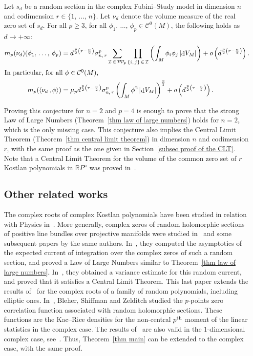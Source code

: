 \documentclass[10pt]{amsart}
\theoremstyle{definition}\newtheorem{defi}[theo]{Definition}\newtheorem{rema}[theo]{Remark}\newtheorem{exam}[theo]{Example}\newtheorem{exem}[theo]{Example}\newtheorem{nota}[theo]{Notation}
\DeclareMathOperator{\dmesure}{d}
\newcommand{\I}{\mathcal{I}}
\newcommand{\clC}{\mathcal{C}}
\newcommand{\pp}{\mathcal{P\!P}\!}
\newcommand{\R}{\mathbb{R}}
\newcommand{\norm}[1]{\left\lvert #1 \right\rvert}
\newcommand{\prsc}[2]{\left\langle #1\,, #2 \right\rangle}
\newcommand{\rmes}[1]{\norm{\dmesure\! V_{#1}}}
\renewcommand{\geq}{\geqslant}
\begin{document}
\begin{conj}
Let $s_d$ be a random section in the complex Fubini--Study model in dimension $n$ and codimension $r \in \{1,\,\dots,\,n\}$. Let $\nu_d$ denote the volume measure of the real zero set of $s_d$. For all $p \geq 3$, for all $\phi_1,\,\dots,\,\phi_p \in \clC^0(M)$, the following holds as $d \to +\infty$:
\begin{align*}
m_p(\nu_d)(\phi_1,\,\dots,\,\phi_p) &= d^{\frac{p}{2}\left(r-\frac{n}{2}\right)}\sigma_{n,\,r}^p \sum_{\I\,\in\,\pp_p} \prod_{\{i,\,j\}\,\in\,\I} \left(\int_M \phi_i\phi_j \rmes{M}\right) + o\left(d^{\frac{p}{2}\left(r-\frac{n}{2}\right)}\right).
\\
\intertext{In particular, for all $\phi \in \clC^0(M)$,}
m_p(\prsc{\nu_d}{\phi}) &= \mu_p d^{\frac{p}{2}\left(r-\frac{n}{2}\right)}\sigma_{n,\,r}^p \left(\int_M \phi^2 \rmes{M}\right)^\frac{p}{2} + o\left(d^{\frac{p}{2}\left(r-\frac{n}{2}\right)}\right).
\end{align*}
\end{conj}

Proving this conjecture for $n=2$ and $p=4$ is enough to prove that the strong Law of Large Numbers (Theorem~\ref{thm law of large numbers}) holds for $n=2$, which is the only missing case. This conjecture also implies the Central Limit Theorem (Theorem~\ref{thm central limit theorem}) in dimension $n$ and codimension $r$, with the same proof as the one given in Section~\ref{subsec proof of the CLT}. Note that a Central Limit Theorem for the volume of the common zero set of $r$ Kostlan polynomials in $\R P^n$ was proved in~\cite{AADL2018a,AADL2018b}.


\subsection{Other related works}

The complex roots of complex Kostlan polynomials have been studied in relation with Physics in~\cite{BBL1992}. More generally, complex zeros of random holomorphic sections of positive line bundles over projective manifolds were studied in~\cite{SZ1999} and some subsequent papers by the same authors. In~\cite{SZ1999}, they computed the asymptotics of the expected current of integration over the complex zeros of such a random section, and proved a Law of Large Numbers similar to Theorem~\ref{thm law of large numbers}. In~\cite{SZ2010}, they obtained a variance estimate for this random current, and proved that it satisfies a Central Limit Theorem. This last paper extends the results of~\cite{ST2004} for the complex roots of a family of random polynomials, including elliptic ones. In~\cite{BSZ2000a}, Bleher, Shiffman and Zelditch studied the $p$-points zero correlation function associated with random holomorphic sections. These functions are the Kac--Rice densities for the non-central $p^{\rm th}$ moment of the linear statistics in the complex case. The results of~\cite{Anc2019} are also valid in the $1$-dimensional complex case, see~\cite[Section~5]{Anc2019}. Thus, Theorem~\ref{thm main} can be extended to the complex case, with the same proof.
\end{document}
